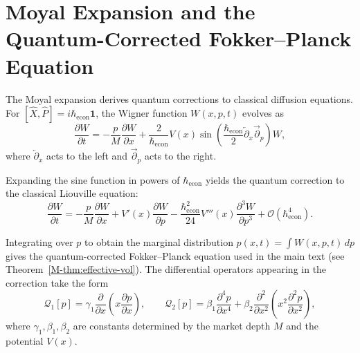 
\section{Moyal Expansion and the Quantum-Corrected Fokker--Planck Equation}
\label{app:moyal}

The Moyal expansion \citep{moyal1949quantum,groenewold1946principles} derives
quantum corrections to classical diffusion equations. For
$[\hat{X}, \hat{P}] = i\hbar_{\mathrm{econ}} \mathbf{1}$, the Wigner function
$W(x, p, t)$ \citep{Hillery1984} evolves as
\begin{equation*}
    \frac{\partial W}{\partial t} = -\frac{p}{M} \frac{\partial W}{\partial x}
    + \frac{2}{\hbar_{\mathrm{econ}}} V(x) \sin\!\left(
        \frac{\hbar_{\mathrm{econ}}}{2}
        \overleftarrow{\partial}_x \overrightarrow{\partial}_p \right) W,
\end{equation*}
where $\overleftarrow{\partial}_x$ acts to the left and
$\overrightarrow{\partial}_p$ acts to the right.

Expanding the sine function in powers of $\hbar_{\mathrm{econ}}$ yields the quantum
correction to the classical Liouville equation:
\begin{equation*}
    \frac{\partial W}{\partial t} = -\frac{p}{M} \frac{\partial W}{\partial x}
    + V'(x) \frac{\partial W}{\partial p}
    - \frac{\hbar_{\mathrm{econ}}^2}{24} V'''(x) \frac{\partial^3 W}{\partial p^3}
    + \mathcal{O}(\hbar_{\mathrm{econ}}^4).
\end{equation*}

Integrating over $p$ to obtain the marginal distribution
$p(x, t) = \int W(x, p, t) \, dp$ gives the quantum-corrected Fokker--Planck
equation used in the main text (see Theorem~\ref{M-thm:effective-vol}). The
differential operators appearing in the correction take the form
\begin{equation*}
    \mathcal{Q}_1[p] = \gamma_1 \frac{\partial}{\partial x}\!
        \left( x \frac{\partial p}{\partial x} \right), \qquad
    \mathcal{Q}_2[p] = \beta_1 \frac{\partial^4 p}{\partial x^4}
        + \beta_2 \frac{\partial^2}{\partial x^2}\!
          \left( x^2 \frac{\partial^2 p}{\partial x^2} \right),
\end{equation*}
where $\gamma_1, \beta_1, \beta_2$ are constants determined by the market depth
$M$ and the potential $V(x)$.

